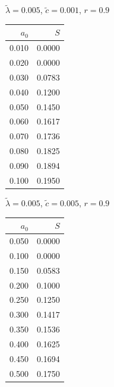 \documentclass[11pt,a4paper,dvipsnames,twosided]{article}
\begin{document}
\begin{minipage}[t]{\textwidth}
    \begin{minipage}[t]{0.32\textwidth}
        \footnotesize
        \begin{flushleft}$\tilde{\lambda}=0.005$, $\tilde{c}=0.001$, $r=0.9$\end{flushleft}
        \begin{tabular}[t]{rr}
            $a_0$ & $S$ \\
            \hline
             0.010 & 0.0000 \\
             0.020 & 0.0000 \\
             0.030 & 0.0783 \\
             0.040 & 0.1200 \\
             0.050 & 0.1450 \\
             0.060 & 0.1617 \\
             0.070 & 0.1736 \\
             0.080 & 0.1825 \\
             0.090 & 0.1894 \\
             0.100 & 0.1950 \\
        \end{tabular}
    \end{minipage}
    \begin{minipage}[t]{0.32\textwidth}
        \footnotesize
        \begin{flushleft}$\tilde{\lambda}=0.005$, $\tilde{c}=0.005$, $r=0.9$\end{flushleft}
        \begin{tabular}[t]{rr}
            $a_0$ & $S$ \\
            \hline
             0.050 & 0.0000 \\
             0.100 & 0.0000 \\
             0.150 & 0.0583 \\
             0.200 & 0.1000 \\
             0.250 & 0.1250 \\
             0.300 & 0.1417 \\
             0.350 & 0.1536 \\
             0.400 & 0.1625 \\
             0.450 & 0.1694 \\
             0.500 & 0.1750 \\
        \end{tabular}
    \end{minipage}
    \begin{minipage}[t]{0.32\textwidth}

\end{minipage}
\end{minipage}
\end{document}
